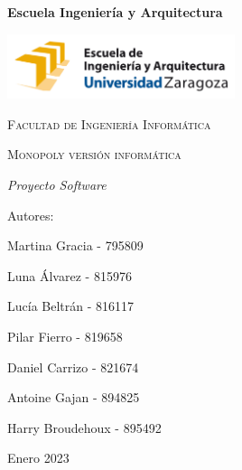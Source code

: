 \documentclass[12pt]{article}
\begin{document}
\begin{titlepage}
    \centering
    {\bfseries\LARGE Escuela Ingeniería y Arquitectura \par}
    \vspace{1cm}
    {\includegraphics[width=0.5\textwidth]{LogoEINA.jpg}\par}
    \vspace{1cm}
    {\scshape\Large Facultad de Ingeniería Informática \par}
    \vspace{3cm}
    {\scshape\Huge Monopoly versión informática \par}
    \vspace{3cm}
    {\itshape\Huge Proyecto Software \par}
    \vfill
    {\Large Autores: \par}
    {\Large Martina Gracia - 795809 \par}
    {\Large Luna Álvarez - 815976 \par}
    {\Large Lucía Beltrán - 816117 \par}
    {\Large Pilar Fierro - 819658 \par}
    {\Large Daniel Carrizo - 821674 \par}
    {\Large Antoine Gajan - 894825 \par}
    {\Large Harry Broudehoux - 895492 \par}
    \vfill
    {\Large Enero 2023 \par}
\end{titlepage}
\tableofcontents
\clearpage
\end{document}
